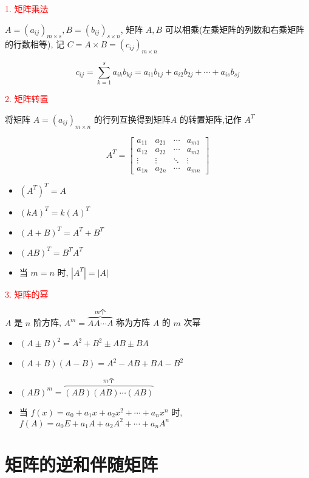 \begin{definition}[矩阵的乘法和幂]
	
	\textcolor{red}{1. 矩阵乘法}
	
	$A = (a_{ij})_{m\times s}, B = (b_{ij})_{s\times n}$, 矩阵 $A, B$ 可以相乘(左乘矩阵的列数和右乘矩阵的行数相等), 记 $C = A\times B = (c_{ij})_{m\times n}$
 
	$$c_{ij}=\sum\limits_{k=1}^{s}a_{ik}b_{kj}=a_{i1}b_{1j}+a_{i2}b_{2j}+\cdots+a_{is}b_{sj}$$
	
	\textcolor{red}{2. 矩阵转置}

	
	将矩阵 $A=(a_{ij})_{m\times n}$ 的行列互换得到矩阵$A$ 的转置矩阵,记作 $A^{T}$  

	$$A^{T} = \begin{bmatrix}
		a_{11} & a_{21} & \cdots & a_{m1}\\
		a_{12} & a_{22} & \cdots & a_{m2}\\
		\vdots & \vdots & \ddots & \vdots\\
		a_{1n} & a_{2n} & \cdots & a_{mn}
	\end{bmatrix}$$
	
	\begin{itemize}
		\item $(A^{T})^{T}=A$
		\item $(kA)^{T} = k(A)^{T}$
		\item $(A+B)^{T} = A^{T}+B^{T}$
		\item $(AB)^{T} = B^{T}A^{T}$
		\item 当 $m=n$ 时, $|A^{T}|=|A|$
	\end{itemize}
	
	\textcolor{red}{3. 矩阵的幂}
	
	$A$ 是 $n$ 阶方阵, $A^{m}=\overbrace{AA\cdots A}^{m\text{个}}$ 称为方阵 $A$ 的 $m$ 次幂
	  
	\begin{itemize}
		\item $(A\pm B)^2=A^2+B^2\pm AB \pm BA$
		\item $(A+B)(A-B)=A^2-AB+BA-B^2$
		\item $(AB)^m=\overbrace{(AB)(AB)\cdots(AB)}^{m\text{个}}$
		\item 当 $f(x)=a_{0}+a_{1}x+a_{2}x^2+\cdots+a_{n}x^{n}$ 时,$f(A)=a_{0}E+a_{1}A+a_{2}A^2+\cdots+a_{n}A^n$
	\end{itemize}
\end{definition}

\section{矩阵的逆和伴随矩阵}
